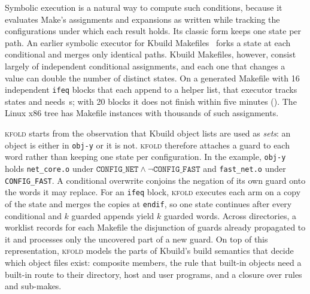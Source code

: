 \documentclass[acmsmall,screen,review]{acmart}
\newcommand{\tool}{\textsc{kfold}\xspace}
\begin{document}
Symbolic execution is a natural way to compute such conditions, because it evaluates Make's assignments and expansions as written while tracking the configurations under which each result holds. Its classic form keeps one state per path. An earlier symbolic executor for Kbuild Makefiles~\cite{nguyen2020using} forks a state at each conditional and merges only identical paths. Kbuild Makefiles, however, consist largely of independent conditional assignments, and each one that changes a value can double the number of distinct states. On a generated Makefile with 16 independent \texttt{ifeq} blocks that each append to a helper list, that executor tracks \NBenchIndirectOSStates states and needs \NBenchIndirectOSSeconds\,s; with 20 blocks it does not finish within five minutes (). The Linux x86 tree has \NLinuxInstances Makefile instances with thousands of such assignments.

\tool starts from the observation that Kbuild object lists are used as \emph{sets}: an object is either in \texttt{obj-y} or it is not. \tool therefore attaches a guard to each word rather than keeping one state per configuration. In the example, \texttt{obj-y} holds \texttt{net\_core.o} under $\texttt{CONFIG\_NET}\land\neg\texttt{CONFIG\_FAST}$ and \texttt{fast\_net.o} under \texttt{CONFIG\_FAST}. A conditional overwrite conjoins the negation of its own guard onto the words it may replace. For an \texttt{ifeq} block, \tool executes each arm on a copy of the state and merges the copies at \texttt{endif}, so one state continues after every conditional and $k$ guarded appends yield $k$ guarded words. Across directories, a worklist records for each Makefile the disjunction of guards already propagated to it and processes only the uncovered part of a new guard. On top of this representation, \tool models the parts of Kbuild's build semantics that decide which object files exist: composite members, the rule that built-in objects need a built-in route to their directory, host and user programs, and a closure over rules and sub-makes.
\end{document}
